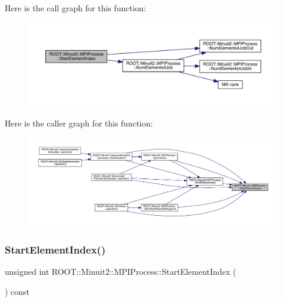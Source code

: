 Here is the call graph for this function\+:
\nopagebreak
\begin{figure}[H]
\begin{center}
\leavevmode
\includegraphics[width=350pt]{dc/d43/classROOT_1_1Minuit2_1_1MPIProcess_a9e6b2dc6f57cc91bb11637b50ba15957_cgraph}
\end{center}
\end{figure}
Here is the caller graph for this function\+:
\nopagebreak
\begin{figure}[H]
\begin{center}
\leavevmode
\includegraphics[width=350pt]{dc/d43/classROOT_1_1Minuit2_1_1MPIProcess_a9e6b2dc6f57cc91bb11637b50ba15957_icgraph}
\end{center}
\end{figure}
\mbox{\label{classROOT_1_1Minuit2_1_1MPIProcess_a9e6b2dc6f57cc91bb11637b50ba15957}} 
\subsubsection{\texorpdfstring{StartElementIndex()}{StartElementIndex()}\hspace{0.1cm}{\footnotesize\ttfamily [2/3]}}
{\footnotesize\ttfamily unsigned int R\+O\+O\+T\+::\+Minuit2\+::\+M\+P\+I\+Process\+::\+Start\+Element\+Index (\begin{DoxyParamCaption}{ }\end{DoxyParamCaption}) const\hspace{0.3cm}{\ttfamily [inline]}}

